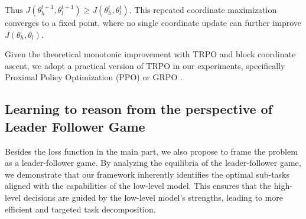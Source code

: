 Thus $J(\theta_h^{t+1}, \theta_l^{t+1}) \geq J(\theta_h^{t}, \theta_l^{t})$. This repeated coordinate maximization converges to a fixed point, where no single coordinate update can further improve $J(\theta_h, \theta_l)$.

Given the theoretical monotonic improvement with TRPO and block coordinate ascent, we adopt a practical version of TRPO in our experiments, specifically Proximal Policy Optimization (PPO) \citep{DBLP:journals/corr/SchulmanWDRK17} or GRPO \citep{shao2024deepseekmath}.



\subsection{Learning to reason from the perspective of Leader Follower Game } \label{sec:app_lfg}


Besides the loss function in the main part, we also propose to frame the problem as a leader-follower game. By analyzing the equilibria of the leader-follower game, we demonstrate that our framework inherently identifies the optimal sub-tasks aligned with the capabilities of the low-level model. This ensures that the high-level decisions are guided by the low-level model’s strengths, leading to more efficient and targeted task decomposition.
